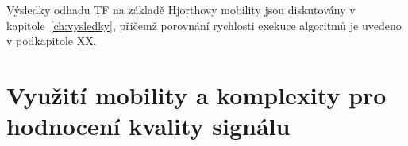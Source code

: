 Výsledky odhadu \acs{TF} na základě Hjorthovy mobility jsou diskutovány v kapitole~\ref{ch:vysledky}, přičemž porovnání rychlosti exekuce algoritmů je uvedeno v podkapitole XX. %

\section{Využití mobility a komplexity pro hodnocení kvality signálu}
\label{sec:hjorth_kvalita}
